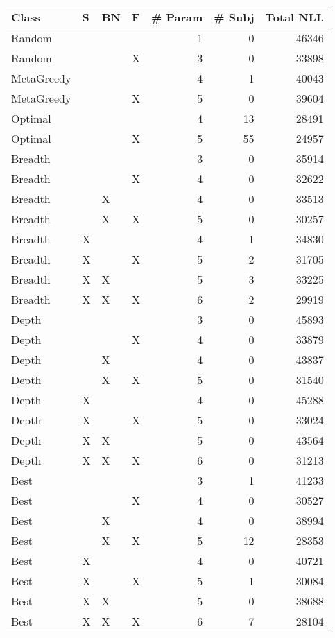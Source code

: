 \begin{tabular}{llllrrr}
\toprule
      Class &  S & BN &  F &  \# Param &  \# Subj &  Total NLL \\
\midrule
     Random &    &    &    &        1 &       0 &      46346 \\
     Random &    &    &  X &        3 &       0 &      33898 \\
 MetaGreedy &    &    &    &        4 &       1 &      40043 \\
 MetaGreedy &    &    &  X &        5 &       0 &      39604 \\
    Optimal &    &    &    &        4 &      13 &      28491 \\
    Optimal &    &    &  X &        5 &      55 &      24957 \\
    Breadth &    &    &    &        3 &       0 &      35914 \\
    Breadth &    &    &  X &        4 &       0 &      32622 \\
    Breadth &    &  X &    &        4 &       0 &      33513 \\
    Breadth &    &  X &  X &        5 &       0 &      30257 \\
    Breadth &  X &    &    &        4 &       1 &      34830 \\
    Breadth &  X &    &  X &        5 &       2 &      31705 \\
    Breadth &  X &  X &    &        5 &       3 &      33225 \\
    Breadth &  X &  X &  X &        6 &       2 &      29919 \\
      Depth &    &    &    &        3 &       0 &      45893 \\
      Depth &    &    &  X &        4 &       0 &      33879 \\
      Depth &    &  X &    &        4 &       0 &      43837 \\
      Depth &    &  X &  X &        5 &       0 &      31540 \\
      Depth &  X &    &    &        4 &       0 &      45288 \\
      Depth &  X &    &  X &        5 &       0 &      33024 \\
      Depth &  X &  X &    &        5 &       0 &      43564 \\
      Depth &  X &  X &  X &        6 &       0 &      31213 \\
       Best &    &    &    &        3 &       1 &      41233 \\
       Best &    &    &  X &        4 &       0 &      30527 \\
       Best &    &  X &    &        4 &       0 &      38994 \\
       Best &    &  X &  X &        5 &      12 &      28353 \\
       Best &  X &    &    &        4 &       0 &      40721 \\
       Best &  X &    &  X &        5 &       1 &      30084 \\
       Best &  X &  X &    &        5 &       0 &      38688 \\
       Best &  X &  X &  X &        6 &       7 &      28104 \\
\bottomrule
\end{tabular}
\unskip